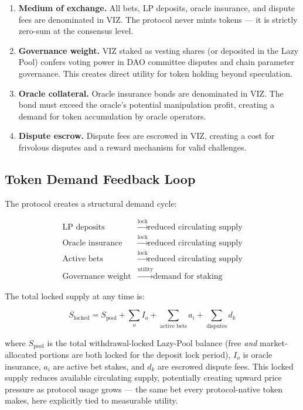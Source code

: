 \documentclass{ledger}
\theoremstyle{plain}
\theoremstyle{remark}
\begin{document}
\begin{enumerate}
  \item \textbf{Medium of exchange.} All bets, LP deposits, oracle insurance,
  and dispute fees are denominated in VIZ. The protocol never mints tokens --- it
  is strictly zero-sum at the consensus level.
  \item \textbf{Governance weight.} VIZ staked as vesting shares (or deposited in
  the Lazy Pool) confers voting power in DAO committee disputes and chain
  parameter governance. This creates direct utility for token holding beyond
  speculation.
  \item \textbf{Oracle collateral.} Oracle insurance bonds are denominated in
  VIZ. The bond must exceed the oracle's potential manipulation profit, creating
  a demand for token accumulation by oracle operators.
  \item \textbf{Dispute escrow.} Dispute fees are escrowed in VIZ, creating a
  cost for frivolous disputes and a reward mechanism for valid challenges.
\end{enumerate}

\subsection{Token Demand Feedback Loop}

The protocol creates a structural demand cycle:

\begin{align*}
\text{LP deposits} &\xrightarrow{\text{lock}} \text{reduced circulating supply} \\
\text{Oracle insurance} &\xrightarrow{\text{lock}} \text{reduced circulating supply} \\
\text{Active bets} &\xrightarrow{\text{lock}} \text{reduced circulating supply} \\
\text{Governance weight} &\xrightarrow{\text{utility}} \text{demand for staking}
\end{align*}

The total locked supply at any time is:

\[
S_{\text{locked}} = S_{\text{pool}} + \sum_o I_o + \sum_{\text{active bets}} a_i
+ \sum_{\text{disputes}} d_k
\]

where $S_{\text{pool}}$ is the total withdrawal-locked Lazy-Pool balance (free
\emph{and} market-allocated portions are both locked for the deposit lock
period), $I_o$ is oracle insurance, $a_i$ are active bet stakes, and $d_k$ are
escrowed dispute fees. This locked supply reduces available circulating supply,
potentially creating upward price pressure as protocol usage grows --- the same
bet every protocol-native token makes, here explicitly tied to measurable
utility.
\end{document}
